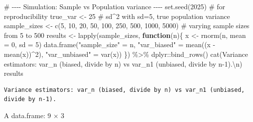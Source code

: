 \documentclass[
  12pt,
  letterpaper,
]{scrbook}
\newenvironment{Shaded}{\begin{snugshade}}{\end{snugshade}}
\newcommand{\AttributeTok}[1]{\textcolor[rgb]{0.40,0.45,0.13}{#1}}
\newcommand{\CommentTok}[1]{\textcolor[rgb]{0.37,0.37,0.37}{#1}}
\newcommand{\ControlFlowTok}[1]{\textcolor[rgb]{0.00,0.23,0.31}{\textbf{#1}}}
\newcommand{\DecValTok}[1]{\textcolor[rgb]{0.68,0.00,0.00}{#1}}
\newcommand{\FunctionTok}[1]{\textcolor[rgb]{0.28,0.35,0.67}{#1}}
\newcommand{\NormalTok}[1]{\textcolor[rgb]{0.00,0.23,0.31}{#1}}
\newcommand{\OtherTok}[1]{\textcolor[rgb]{0.00,0.23,0.31}{#1}}
\newcommand{\SpecialCharTok}[1]{\textcolor[rgb]{0.37,0.37,0.37}{#1}}
\newcommand{\StringTok}[1]{\textcolor[rgb]{0.13,0.47,0.30}{#1}}
\theoremstyle{plain}
\theoremstyle{definition}
\theoremstyle{remark}
\begin{document}
\begin{Shaded}
\begin{Highlighting}[]
\CommentTok{\# {-}{-}{-}{-} Simulation: Sample vs Population variance {-}{-}{-}{-}}
\FunctionTok{set.seed}\NormalTok{(}\DecValTok{2025}\NormalTok{)  }\CommentTok{\# for reproducibility}
\NormalTok{true\_var }\OtherTok{\textless{}{-}} \DecValTok{25}  \CommentTok{\# sd\^{}2 with sd=5, true population variance}
\NormalTok{sample\_sizes }\OtherTok{\textless{}{-}} \FunctionTok{c}\NormalTok{(}\DecValTok{5}\NormalTok{, }\DecValTok{10}\NormalTok{, }\DecValTok{20}\NormalTok{, }\DecValTok{50}\NormalTok{, }\DecValTok{100}\NormalTok{, }\DecValTok{250}\NormalTok{, }\DecValTok{500}\NormalTok{, }\DecValTok{1000}\NormalTok{, }\DecValTok{5000}\NormalTok{) }\CommentTok{\# varying sample sizes from 5 to 500}
\NormalTok{results }\OtherTok{\textless{}{-}} \FunctionTok{lapply}\NormalTok{(sample\_sizes, }\ControlFlowTok{function}\NormalTok{(n)\{}
\NormalTok{  x }\OtherTok{\textless{}{-}} \FunctionTok{rnorm}\NormalTok{(n, }\AttributeTok{mean =} \DecValTok{0}\NormalTok{, }\AttributeTok{sd =} \DecValTok{5}\NormalTok{)}
  \FunctionTok{data.frame}\NormalTok{(}\StringTok{"sample\_size"} \OtherTok{=}\NormalTok{ n, }\StringTok{"var\_biased"} \OtherTok{=} \FunctionTok{mean}\NormalTok{((x }\SpecialCharTok{{-}} \FunctionTok{mean}\NormalTok{(x))}\SpecialCharTok{\^{}}\DecValTok{2}\NormalTok{), }\StringTok{"var\_unbiased"} \OtherTok{=} \FunctionTok{var}\NormalTok{(x))}
\NormalTok{\}) }\SpecialCharTok{\%\textgreater{}\%}\NormalTok{ dplyr}\SpecialCharTok{::}\FunctionTok{bind\_rows}\NormalTok{()}
\FunctionTok{cat}\NormalTok{(}\StringTok{\textquotesingle{}Variance estimators: var\_n (biased, divide by n) vs var\_n1 (unbiased, divide by n{-}1).}\SpecialCharTok{\textbackslash{}n}\StringTok{\textquotesingle{}}\NormalTok{)}
\NormalTok{results}
\end{Highlighting}
\end{Shaded}

\begin{verbatim}
Variance estimators: var_n (biased, divide by n) vs var_n1 (unbiased, divide by n-1).
\end{verbatim}

A data.frame: 9 × 3
\end{document}
